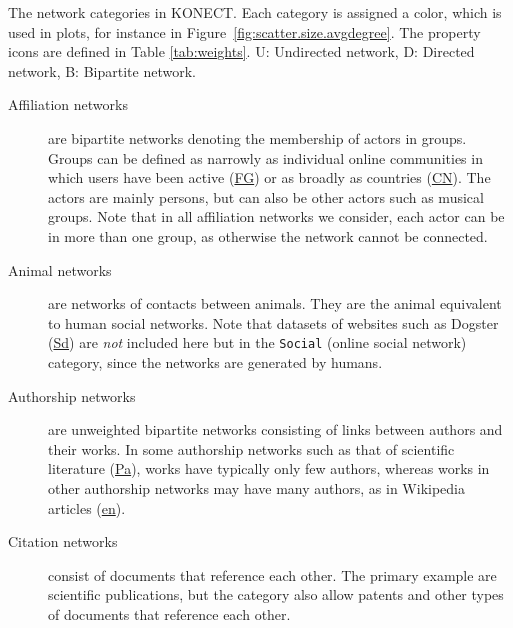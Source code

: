 \documentclass{article}
\begin{document}
\begin{table}
  \caption{
    The network categories in KONECT.  
    Each category is assigned a color, which is used in plots, for
    instance in Figure~\ref{fig:scatter.size.avgdegree}. The property
    icons are defined in Table \ref{tab:weights}.  U: Undirected
    network, D: Directed network, B: Bipartite network. 
    \label{tab:categories}
  }
  \centering
  \makebox[\textwidth]{
    
  }
\end{table}

\begin{description}
\item[Affiliation networks] are bipartite networks denoting the
  membership of actors in groups.  Groups can be defined as narrowly as
  individual online communities in which users have been active
  (\href{http://konect.uni-koblenz.de/networks/flickr-groupmemberships}{\textsf{FG}})
  or as broadly as countries
  (\href{http://konect.uni-koblenz.de/networks/dbpedia-country}{\textsf{CN}}). The
  actors are mainly persons, but can also be other actors such as musical
  groups. Note that in all affiliation networks we consider, each actor
  can be in more than one group, as otherwise the network cannot be
  connected.

\item[Animal networks] are networks of contacts between animals.  
  They are the animal equivalent to human social networks.  Note that
  datasets of websites such as Dogster
  (\href{http://konect.uni-koblenz.de/networks/petster-friendships-dog}{\textsf{Sd}})
  are \emph{not} included here but in the \texttt{Social} (online social
  network) category, since the networks are generated by humans. 

\item[Authorship networks] are unweighted bipartite networks consisting
  of links between authors and their works.  In some authorship networks
  such as that of scientific literature
  (\href{http://konect.uni-koblenz.de/networks/dblp-author}{\textsf{Pa}}),
  works have typically only few authors, whereas works in other
  authorship networks may have many authors, as in Wikipedia articles
    (\href{http://konect.uni-koblenz.de/networks/edit-enwiki}{\textsf{en}}).

\item[Citation networks] consist of documents that reference each
  other.  The primary example are scientific publications, but the
  category also allow patents and other types of documents that
  reference each other. 


\end{description}
\end{document}
